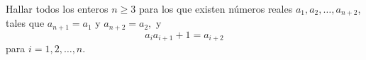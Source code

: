 Hallar todos los enteros $n \geq 3$ para los que existen números reales $a_1, a_2, \dots , a_{n+2}$, tales que $a_{n+1} =a_1$ y $a_{n+2} =a_2,$ y
\[a_ia_{i+1} + 1 = a_{i+2}\]
para $i = 1,2,\dots,n$.